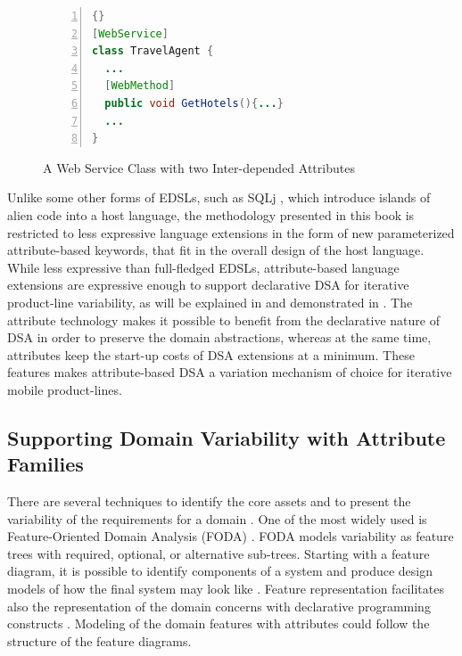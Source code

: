 \begin{figure}[ht]
\begin{center}
\begin{minipage}{7cm}
\begin{scriptsize}
\begin{lstlisting}[numbers=left,language=Java,frame=leftline]{}
[WebService]
class TravelAgent {
  ...
  [WebMethod]
  public void GetHotels(){...}
  ...
}
\end{lstlisting}
\end{scriptsize}
\end{minipage}
\end{center}
\caption{A Web Service Class with two Inter-depended Attributes}
\label{fig:webservice}
\end{figure}

Unlike some other forms of EDSLs, such as SQLj \cite{www.sqlj}, which introduce islands of alien code into a host language, the methodology presented in this book is restricted to less expressive language extensions in the form of new parameterized attribute-based keywords, that fit in the overall design of the host language. While less expressive than full-fledged EDSLs, attribute-based language extensions are expressive enough to support declarative DSA for iterative product-line variability, as will be explained in  and demonstrated in . The attribute technology makes it possible to benefit from the declarative nature of DSA in order to preserve the domain abstractions, whereas at the same time, attributes keep the start-up costs of DSA extensions at a minimum. These features makes attribute-based DSA a variation mechanism of choice for iterative mobile product-lines.


\subsection{Supporting Domain Variability with Attribute Families}
\label{attribute.families}

There are several techniques to identify the core assets and to present the variability of the requirements for a domain \cite{Requirements.Engineering}. One of the most widely used is Feature-Oriented Domain Analysis (FODA) \cite{foda.90,generative.00,foda.sem}. FODA models variability as feature trees with required, optional, or alternative sub-trees. Starting with a feature diagram, it is possible to identify components of a system and produce design models of how the final system may look like \cite{foda.uml1}. Feature representation facilitates also the representation of the domain concerns with declarative programming constructs \cite{foda.dsl}. Modeling of the domain features with attributes could follow the structure of the feature diagrams.

